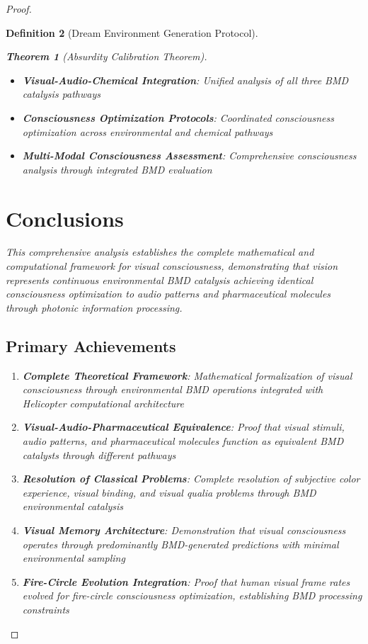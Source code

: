 \documentclass[12pt,a4paper]{article}
\newtheorem{theorem}{Theorem}[section]
\newtheorem{definition}[theorem]{Definition}
\begin{document}
\begin{proof}
\begin{definition}[Dream Environment Generation Protocol]
\begin{theorem}[Absurdity Calibration Theorem]
\begin{itemize}
\item \textbf{Visual-Audio-Chemical Integration}: Unified analysis of all three BMD catalysis pathways
\item \textbf{Consciousness Optimization Protocols}: Coordinated consciousness optimization across environmental and chemical pathways
\item \textbf{Multi-Modal Consciousness Assessment}: Comprehensive consciousness analysis through integrated BMD evaluation
\end{itemize}

\section{Conclusions}

This comprehensive analysis establishes the complete mathematical and computational framework for visual consciousness, demonstrating that vision represents continuous environmental BMD catalysis achieving identical consciousness optimization to audio patterns and pharmaceutical molecules through photonic information processing.

\subsection{Primary Achievements}

\begin{enumerate}
\item \textbf{Complete Theoretical Framework}: Mathematical formalization of visual consciousness through environmental BMD operations integrated with Helicopter computational architecture

\item \textbf{Visual-Audio-Pharmaceutical Equivalence}: Proof that visual stimuli, audio patterns, and pharmaceutical molecules function as equivalent BMD catalysts through different pathways

\item \textbf{Resolution of Classical Problems}: Complete resolution of subjective color experience, visual binding, and visual qualia problems through BMD environmental catalysis

\item \textbf{ Visual Memory Architecture}: Demonstration that visual consciousness operates through predominantly BMD-generated predictions with minimal environmental sampling

\item \textbf{Fire-Circle Evolution Integration}: Proof that human visual frame rates evolved for fire-circle consciousness optimization, establishing BMD processing constraints


\end{enumerate}
\end{theorem}
\end{definition}
\end{proof}
\end{document}
